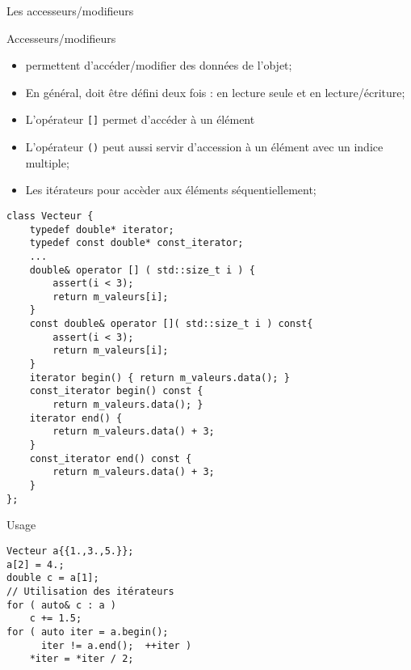 \documentclass[handout,10pt]{beamer}
\begin{document}
\begin{frame}[fragile]{Les accesseurs/modifieurs}
\tiny
\begin{block}{Accesseurs/modifieurs}
\begin{itemize}
\item permettent d'accéder/modifier des données de l'objet;
\item En général, doit être défini deux fois : en lecture seule et en lecture/écriture;
\item L'opérateur \lstinline$[]$ permet d'accéder à un élément
\item L'opérateur \lstinline$()$ peut aussi servir d'accession à un élément avec un indice multiple;
\item Les itérateurs pour accèder aux éléments séquentiellement;
\end{itemize}
\end{block}
\begin{minipage}{0.59\textwidth}
\begin{lstlisting}
class Vecteur { 
    typedef double* iterator;
    typedef const double* const_iterator;
    ...
    double& operator [] ( std::size_t i ) {
        assert(i < 3);
        return m_valeurs[i]; 
    }
    const double& operator []( std::size_t i ) const{
        assert(i < 3);
        return m_valeurs[i];
    }
    iterator begin() { return m_valeurs.data(); }
    const_iterator begin() const {
        return m_valeurs.data(); }
    iterator end() {
        return m_valeurs.data() + 3;
    }
    const_iterator end() const {
        return m_valeurs.data() + 3;
    }
};
\end{lstlisting}
\end{minipage}\hfill
\begin{minipage}{0.38\textwidth}
\begin{block}{Usage}
\begin{lstlisting}
Vecteur a{{1.,3.,5.}};
a[2] = 4.;
double c = a[1];
// Utilisation des itérateurs
for ( auto& c : a ) 
    c += 1.5;
for ( auto iter = a.begin(); 
      iter != a.end();  ++iter )
    *iter = *iter / 2;
\end{lstlisting}
\end{block}
\end{minipage}
\end{frame}
\end{document}
